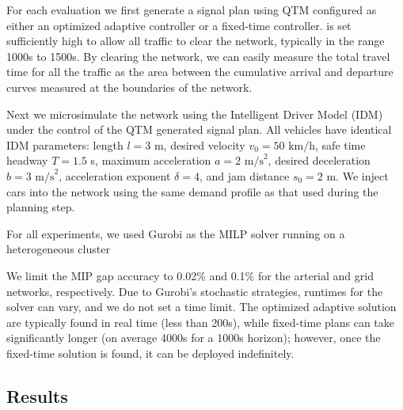 For each evaluation we first generate a signal plan using QTM configured as either an optimized adaptive controller or a fixed-time controller. \TMAX is set sufficiently high to allow all traffic to clear the network,
typically in the range 1000s to 1500s.
%
By clearing the network, we can easily measure the total travel time for all the
traffic as the area between the cumulative arrival and departure curves measured
at the boundaries of the network.
%
%
%

Next we microsimulate the network using the Intelligent Driver Model (IDM) \cite{treiber2000congested} under the control of the QTM generated signal plan. All vehicles have identical IDM parameters: length $l=3$ m, desired velocity $v_0 = 50 \text{ km/h}$, safe time headway $T=1.5$ s, maximum acceleration
$a=2 \text{ m/s}^2$, desired deceleration $b = 3 \text{ m/s}^2$, acceleration exponent $\delta = 4$, and jam distance $s_0 = 2$ m.
We inject cars into the network using the same demand profile as that used during the planning step.


For all experiments, we used Gurobi as the MILP solver running on a
heterogeneous cluster 

We limit the MIP gap accuracy to 0.02\% and 0.1\% for the arterial and grid
networks, respectively.
%
Due to Gurobi's stochastic strategies, runtimes for the solver can vary, and we
do not set a time limit.
%
The optimized adaptive solution are typically found in real time (less than
200s), while fixed-time plans can take significantly longer (on average 4000s
for a 1000s horizon); however, once the fixed-time solution is found, it can be
deployed indefinitely.




\subsection{Results}


